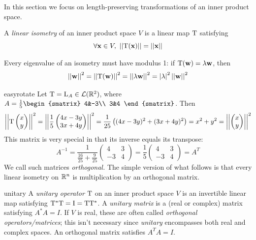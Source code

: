 In this section we focus on length-preserving transformations of an inner product space.

\begin{defn}{}{}
	A \emph{linear\footnotemark{} isometry} of an inner product space $V$ is a linear map $\mathrm{T}$ satisfying
	\[
		\forall \vx\in V,\ \Nm{\rT(\vx)}=\Nm{\vx}
	\]
\end{defn}


Every eigenvalue of an isometry must have modulus 1: if $\mathrm{T}({\mathbf{w}})=\lambda{\mathbf{w}}$, then
\[
	\left| \left| {\mathbf{w}}\right|\right|^2 =\left| \left| \mathrm{T}({\mathbf{w}})\right|\right|^2
	=\left| \left| \lambda{\mathbf{w}}\right|\right|^2 =\left| \lambda\right|^2\left| \left| {\mathbf{w}}\right|\right|^2
\]

\begin{example}{}{easyrotate}
	Let $\mathrm{T}=\mathrm{L}_A\in\mathcal{L}(\mathbb{R}^2)$, where $A=\frac 15
	\begin{smatrix}
		4&-3\\
		3&4
	\end{smatrix}$. Then
	\[
		\left| \left| \mathrm{T}\begin{pmatrix}x\\y\end{pmatrix}\right|\right|^2 =\left| \left| \frac 15\begin{pmatrix}4x-3y\\3x+4y\end{pmatrix}\right|\right|^2
		=\frac 1{25}\left((4x-3y)^2+(3x+4y)^2\right)
		=x^2+y^2 =\left| \left| \begin{pmatrix}x\\y\end{pmatrix}\right|\right|^2
	\]
	This matrix is very special in that its inverse equals its transpose:
	\[
		A^{-1}=\frac 1{\frac{16}{25}+\frac 9{25}}
		\begin{pmatrix}
			4&3\\
			-3&4
		\end{pmatrix}
		=\frac 1{5}
		\begin{pmatrix}
			4&3\\
			-3&4
		\end{pmatrix}
		=A^T
	\]
	We call such matrices \emph{orthogonal.} The simple version of what follows is that every linear isometry on $\mathbb{R}^n$ is multiplication by an orthogonal matrix.
\end{example}


\begin{defn}{}{unitary}
	A \emph{unitary operator} $\mathrm{T}$ on an inner product space $V$ is an invertible linear map satisfying $\mathrm{T}^*\mathrm{T}=\mathrm{I}=\mathrm{T}\mathrm{T}^*$. A \emph{unitary matrix} is a (real or complex) matrix satisfying $A^*A=I$.\smallbreak
	If $V$ is real, these are often called \emph{orthogonal operators/matrices}; this isn't necessary since \emph{unitary} encompasses both real and complex spaces. An orthogonal matrix satisfies $A^TA=I$.
\end{defn}

